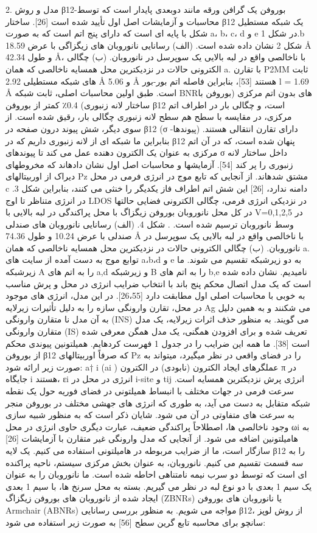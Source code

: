 2. مدل و روش β12-بوروفن یک گرافن ورقه مانند دوبعدی پایدار است که توسط محاسبات و آزمایشات اصل اول تأیید شده است [26]. ساختار β12 یک شبکه مستطیل شکل با پایه ای است که دارای پنج اتم است که به صورت a، b، c، d و e در شکل 1.b شکل 2 نشان داده شده است. (الف) رسانایی نانوروبان های زیگزاگی با عرض 18.59 Å و طول 42.34 Å، با ناخالصی واقع در لبه بالایی یک سوپرسل در نانوروبان. (ب) چگالی الکترونی حالات در نزدیکترین محل همسایه ناخالصی که همان a. با تقارن P2MM ثابت های شبکه مستطیلی 2.92 Å و 5.06 Å هستند [53]، بنابراین فاصله اتم بور-بور l = 1.69 Å است. طبق اولین محاسبات اصلی، ثابت شبکه BNRهای بدون اتم مرکزی (بوروفن با ساختار لانه زنبوری) 0.4٪ کمتر از بوروفن β12 است، و چگالی بار در اطراف اتم مرکزی، در مقایسه با سطح هم سطح لانه زنبوری چگالی بار، رقیق شده است. از سوی دیگر، شش پیوند درون صفحه در β12 (σ -پیوندها) دارای تقارن انتقالی هستند. بنابراین ما شبکه ای از لانه زنبوری داریم که در β12 پنهان شده است، که در آن اتم مرکزی به عنوان یک الکترون دهنده عمل می کند تا پیوندهای σ داخل ساختار لانه زنبوری را پر کند [54]. 
آزمایشها و محاسبات اصل اول نشان دادهاند که مخروطهای دیراک از اوربیتالهای Pz مشتق شدهاند. از آنجایی که تابع موج در انرژی فرمی در محل c دامنه ندارد، [26] این شش اتم اطراف فاز یکدیگر را خنثی می کنند، بنابراین شکل 3. در انرژی متناظر تا اوج LDOS در نزدیکی انرژی فرمی، چگالی الکترونی فضایی حالتها در کل محل نانوروبان بوروفن زیگزاگ با محل پراکندگی در لبه بالایی با V=0,1,2,5 در وسط نانوروبان ترسیم شده است. . شکل 4. (الف) رسانایی نانوروبان های صندلی صندلی با عرض 10.24 و طول 74.36 Å با ناخالصی واقع در لبه بالایی یک سوپرسل در نانوروبان. (ب) چگالی الکترونی حالات در نزدیکترین محل همسایه ناخالصی که همان a. توابع موج به دست آمده از سایت های a،b،d و e به دو زیرشبکه تقسیم می شوند. ما زیرشبکه A را به اتم های a,d و زیرشبکه B را به اتم های b,e نامیدیم. نشان داده شده است که یک مدل اتصال محکم پنج باند با انتخاب ضرایب انرژی در محل و پرش مناسب به خوبی با محاسبات اصلی اول مطابقت دارد [26،55]. در این مدل، انرژی های موجود در محل، تقارن وارونگی سازه را به دلیل تأثیرات زیرلایه Ag می شکنند و به همین دلیل به آن مدل نا متقارن وارونگی (INS) می گویند. به منظور حذف اثرات زیرلایه، یک مدل متقارن وارونگی (IS) تعریف شده و برای افزودن همگنی، یک مدل همگن معرفی شده است [38]. ما همه این ضرایب را در جدول 1 فهرست کردهایم. همیلتونین پیوندی محکم از بوروفن β12 که صرفاً اوربیتالهای Pz را در فضای واقعی در نظر میگیرد، میتواند به صورت زیر ارائه شود:
a† i (ai ) عملگرهای ایجاد الکترون (نابودی) در الکترون π در جایگاه i هستند، εi انرژی در محل در i-site و tij انرژی پرش نزدیکترین همسایه است. سرعت فرمی در جهات مختلف با انبساط همیلتونی در فضای فوریه حول یک نقطه شبکه متقابل به دست می آید، به طوری که انرژی های جهشی مختلف در بوروفن منجر به سرعت های متفاوتی در آن می شود. شایان ذکر است که به منظور شبیه سازی وجود ناخالصی ها، اصطلاحاً پراکندگی ضعیف، عبارت دیگری حاوی انرژی در محل ωi به هامیلتونین اضافه می شود. از آنجایی که مدل وارونگی غیر متقارن با آزمایشات [26] سازگار است، ما از ضرایب مربوطه در هامیلتونی استفاده می کنیم. یک لایه β12 را به سه قسمت تقسیم می کنیم. نانوروبان، به عنوان بخش مرکزی سیستم، ناحیه پراکنده ای است که توسط دو سرب نیمه نامتناهی احاطه شده است. ما نانوروبان را به عنوان یک سیم 1 بعدی با دو نوع لبه در نظر می گیریم. بسته به محل سرنخ ها، با سیم 1 بعدی ایجاد شده از نانوروبان های بوروفن زیگزاگ (ZBNRs) یا نانوروبان های بوروفن Armchair (ABNRs) مواجه می شویم. به منظور بررسی رسانایی β12، از روش لوپز سانچو برای محاسبه تابع گرین سطح [56] به صورت زیر استفاده می شود:
